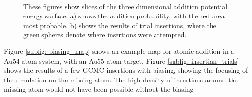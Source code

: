 \begin{figure}
    \centering
     \\
	\caption[Addition biasing with a Lennard Jones potential.]{These figures show slices of the three dimensional addition potential energy surface. a) shows the addition probability, with the red area most probable. b) shows the results of trial insertions, where the green spheres denote where insertions were attempted.}
	\label{fig:biasing}
\end{figure}
Figure \ref{subfig: biasing_map} shows an example map for atomic addition in a Au54 atom system, with an Au55 atom target.
Figure \ref{subfig: insertian_trials} shows the results of a few GCMC insertions with biasing, showing the focusing of the simulation on the missing atom.
The high density of insertions around the missing atom would not have been possible without the biasing.